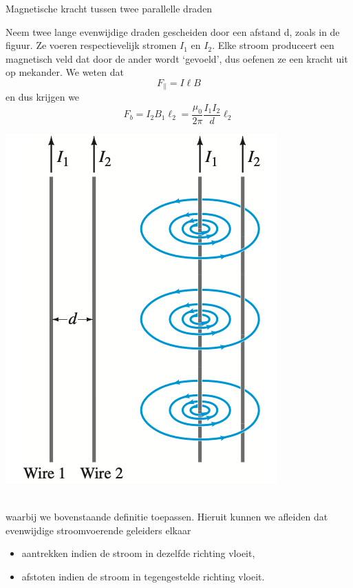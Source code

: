 \begin{app}{Magnetische kracht tussen twee parallelle draden}
    \begin{minipage}{0.77\textwidth}
        Neem twee lange evenwijdige draden gescheiden door een afstand d, zoals in de figuur. Ze voeren respectievelijk stromen $I_1$ en $I_2$.
        Elke stroom produceert een magnetisch veld dat door de ander wordt ‘gevoeld’, dus oefenen ze een kracht uit op mekander.
        We weten dat
        \begin{equation*}
            F_{\parallel} = I\ell B
        \end{equation*}
        en dus krijgen we
        \begin{equation*}
            F_b = I_{2}B_{1}\ell_{2} = \dfrac{\mu_0}{2\pi}\dfrac{I_{1}I_{2}}{d}\ell_{2}
        \end{equation*}
    \end{minipage}
    \begin{minipage}{.19\textwidth}
        \includegraphics[scale=0.225]{Images/Magnetisme/MagnetischeKrachtTussenTweeParallelleDraden}
    \end{minipage} \vspace{0.2cm}\\
    waarbij we bovenstaande definitie toepassen. Hieruit kunnen we afleiden dat evenwijdige stroomvoerende geleiders elkaar
    \begin{itemize}
        \item aantrekken indien de stroom in dezelfde richting vloeit,
        \item afstoten indien de stroom in tegengestelde richting vloeit.
    \end{itemize}
\end{app}

